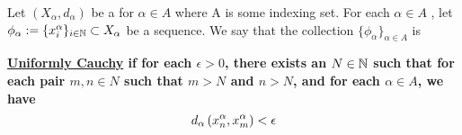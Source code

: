 \label{def:uniformlycauchy}
\newcommand{\UniformlyCauchy}[0]{
    \bf \hyperref[def:uniformlycauchy]{Uniformly Cauchy} \rm
}
\begin{df}
	Let $(X_\alpha, d_\alpha)$ be a \PseudometricSpace
	for $\alpha \in A$ where A is some indexing set. 
	For each $\alpha \in A$
	, let $\phi_\alpha :=\{x_i^\alpha\}_{i \in \mathbb{N}} \subset X_{\alpha}$
	be a sequence. 
	We say that the collection $\{\phi_\alpha\}_{\alpha \in A}$ 
	is 
	\UniformlyCauchy if for each $\epsilon > 0$, there exists an 
	$N \in \mathbb{N}$ such that for each pair $m,n \in N$
	such that $m>N$ and $n>N$, and for each $\alpha \in A$, 
	we have 
	\begin{equation}
	d_{\alpha} \left( x^{\alpha}_n, x^{\alpha}_m\right) < \epsilon
	\end{equation}
\end{df}
